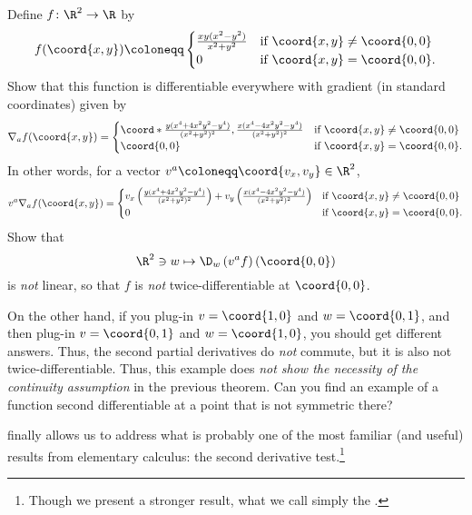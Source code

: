 \begin{exr}{}{}
Define $f\colon \R ^2\rightarrow \R$ by
\begin{equation}
f(\coord{x,y})\coloneqq \begin{cases}\frac{xy(x^2-y^2)}{x^2+y^2} & \text{if }\coord{x,y}\neq \coord{0,0} \\ 0 & \text{if }\coord{x,y}=\coord{0,0}.\end{cases}
\end{equation}
Show that this function is differentiable everywhere with gradient (in standard coordinates) given by
{\scriptsize
\begin{equation*}
\nabla _af(\coord{x,y})=\begin{cases}\coord*{\frac{y(x^4+4x^2y^2-y^4)}{(x^2+y^2)^2},\frac{x(x^4-4x^2y^2-y^4)}{(x^2+y^2)^2}} & \text{if }\coord{x,y}\neq \coord{0,0} \\ \coord{0,0} & \text{if }\coord{x,y}=\coord{0,0}.\end{cases}
\end{equation*}
}
In other words, for a vector $v^a\coloneqq \coord{v_x,v_y}\in \R ^2$,
{\tiny
\begin{equation}
v^a\nabla _af(\coord{x,y})=\begin{cases}v_x\left(\frac{y(x^4+4x^2y^2-y^4)}{(x^2+y^2)^2} \right) +v_y\left( \frac{x(x^4-4x^2y^2-y^4)}{(x^2+y^2)^2}\right) & \text{if }\coord{x,y}\neq \coord{0,0} \\ 0 & \text{if }\coord{x,y}=\coord{0,0}.\end{cases}
\end{equation}
}
Show that
\begin{equation}
\R ^2\ni w\mapsto \D _w\left( v^af\right) (\coord{0,0})
\end{equation}
is \emph{not} linear, so that $f$ is \emph{not} twice-differentiable at $\coord{0,0}$.
\begin{rmk}
On the other hand, if you plug-in $v=\coord{1,0}$ and $w=\coord{0,1}$, and then plug-in $v=\coord{0,1}$ and $w=\coord{1,0}$, you should get different answers.  Thus, the second partial derivatives do \emph{not} commute, but it is also not twice-differentiable.  Thus, this example does \emph{not show the necessity of the continuity assumption} in the previous theorem.  Can you find an example of a function second differentiable at a point that is not symmetric there?
\end{rmk}
\end{exr}
 finally allows us to address what is probably one of the most familiar (and useful) results from elementary calculus:  the second derivative test.\footnote{Though we present a stronger result, what we call simply the .}
